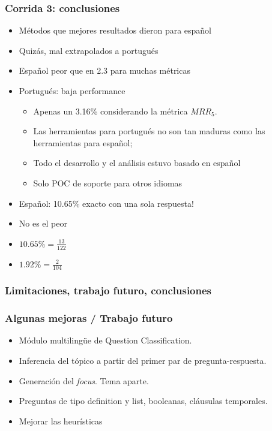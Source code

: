 \begin{frame}
\frametitle{Corrida 3: conclusiones}

\begin{itemize}
  \item Métodos que mejores resultados dieron para español
  \item Quizás, mal extrapolados a portugués
  \item Español peor que en 2.3 para muchas métricas
  \item Portugués: baja performance
  \begin{itemize}
    \item Apenas un 3.16\% considerando la métrica $MRR_5$. 
    \item Las herramientas para portugués no son tan maduras como las herramientas para español; 
    \item Todo el desarrollo y el análisis estuvo basado en español
    \item Solo POC de soporte para otros idiomas
  \end{itemize}
  \item Español: 10.65\% exacto con una sola respuesta! 
  \item No es el peor
\end{itemize}
\begin{itemize}
  \item $10.65\% = \frac{13}{122}$
  \item $1.92\% = \frac{2}{104}$
\end{itemize}
\end{frame}



\subsubsection*{Limitaciones, trabajo futuro, conclusiones}

\begin{frame}
\frametitle{Algunas mejoras / Trabajo futuro}
\begin{itemize}
  \item Módulo multilingüe de Question Classification.
  \item Inferencia del tópico a partir del primer par de pregunta-respuesta.
  \item Generación del \textit{focus}. Tema aparte.
  \item Preguntas de tipo definition y list, booleanas, cláusulas temporales.
  \item Mejorar las heurísticas
\end{itemize}

\end{frame}



